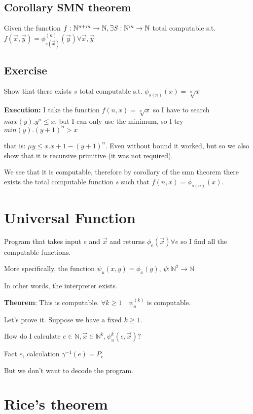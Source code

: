 \documentclass{amsbook}
\newcommand{\nat}{\ensuremath{\mathbb{N}}}
\theoremstyle{definition}
\theoremstyle{remark}
\numberwithin{section}{chapter}
\numberwithin{equation}{chapter}
\begin{document}
\section {Corollary SMN theorem}
Given the function $ f:\nat^{n+m}\rightarrow\nat,\\ \exists S:\nat^m\rightarrow\nat $ total computable s.t. $ f(\vec{x},\vec{y}) = \phi_{s(\vec{x})}^{(n)}(\vec{y}) \forall \vec{x},\vec{y}$

\section {Exercise}

Show that there exists $s$ total computable s.t. $ \phi_{s(n)}(x) = \sqrt[n]{x} $

\textbf{Execution:} I take the function $ f(n,x) = \sqrt[n]{x} $ so I have to search \\ $ max(y) . y^n \leq x $, but I can only use the minimum, so I try $ min(y). (y+1)^n > x $

that is: $ \mu y \leq x . x+1 - (y+1)^n $. Even without bound it worked, but so we also show that it is recursive primitive (it was not required).

We see that it is computable, therefore by corollary of the smn theorem there exists the total computable function $s$ such that $ f(n,x) = \phi_{s(n)}(x) $.

\chapter {Universal Function}
Program that takes input $ e $ and $ \vec{x} $ and returns $ \phi_e(\vec{x}) \forall e$ so I find all the computable functions.

More specifically, the function $ \psi_u(x,y) = \phi_x(y)$, $ \psi : \nat^2 \rightarrow \nat $

In other words, the interpreter exists.

\textbf{Theorem}: This is computable. $ \forall k \geq 1  \quad  \psi_u^{(k)} $ is computable.

Let's prove it. Suppose we have a fixed $ k \geq 1 $.

How do I calculate $ e \in \nat, \vec{x} \in \nat^k, \psi_u^{k}(e, \vec{x}) $?

Fact $e$, calculation $ \gamma^{-1}(e) = P_e $

But we don't want to decode the program.

\chapter {Rice's theorem}
\end{document}
